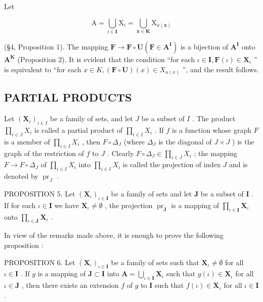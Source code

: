 Let

\[
\mathrm{A} = \bigcup_ {i \in \mathbf {I}} \mathrm{X} _ {i} = \bigcup_ {\boldsymbol {x} \in \mathbf {K}} \mathrm{X} _ {u (\boldsymbol {x})}
\]

(§4, Proposition 1). The mapping \(\mathbf{F} \to \mathbf{F} \circ \mathbf{U} (\mathbf{F} \in \mathbf{A}^{\mathbf{I}})\) is a bijection of \(\mathbf{A}^{\mathbf{I}}\) onto \(\mathbf{A}^{\mathbf{K}}\) (Proposition 2). It is evident that the condition ``for each \(\iota \in \mathbf{I}, \mathbf{F}(\iota) \in \mathbf{X}_{\iota}\) '' is equivalent to ``for each \(x \in K, (\mathbf{F} \circ \mathbf{U})(x) \in X_{u(x)}\) '', and the result follows.

\subsection{PARTIAL PRODUCTS}

Let \((\mathbf{X}_i)_{i\in I}\) be a family of sets, and let \(J\) be a subset of \(I\) . The product \(\prod_{i\in J} X_i\) is called a partial product of \(\prod_{i\in I} X_i\) . If \(f\) is a function whose graph \(F\) is a member of \(\prod_{i\in I} X_i\) , then \(F \circ \Delta_J\) (where \(\Delta_J\) is the diagonal of \(J \times J\) ) is the graph of the restriction of \(f\) to \(J\) . Clearly \(F \circ \Delta_J \in \prod_{i\in J} X_i\) ; the mapping \(F \to F \circ \Delta_J\) of \(\prod_{i\in I} X_i\) into \(\prod_{i\in I} X_i\) is called the projection of index \(J\) and is denoted by \(\operatorname{pr}_J\) .

PROPOSITION 5. Let \((\mathbf{X}_{\iota})_{\iota \in \mathbf{I}}\) be a family of sets and let \(\mathbf{J}\) be a subset of \(\mathbf{I}\) . If for each \(\iota \in \mathbf{I}\) we have \(\mathbf{X}_{\iota} \neq \emptyset\) , the projection \(\operatorname{pr}_{\mathbf{J}}\) is a mapping of \(\prod_{\iota \in \mathbf{I}} \mathbf{X}_{\iota}\) onto \(\prod_{\iota \in \mathbf{J}} \mathbf{X}_{\iota}\) .

In view of the remarks made above, it is enough to prove the following proposition :

PROPOSITION 6. Let \((\mathbf{X}_{\iota})_{\iota \in \mathbf{I}}\) be a family of sets such that \(\mathbf{X}_{\iota} \neq \emptyset\) for all \(\iota \in \mathbf{I}\) . If \(g\) is a mapping of \(\mathbf{J} \subset \mathbf{I}\) into \(\mathbf{A} = \bigcup_{\iota \in \mathbf{I}} \mathbf{X}_{\iota}\) such that \(g(\iota) \in \mathbf{X}_{\iota}\) for all \(\iota \in \mathbf{J}\) , then there exists an extension \(f\) of \(g\) to \(\mathbf{I}\) such that \(f(\iota) \in \mathbf{X}_{\iota}\) for all \(\iota \in \mathbf{I}\) .

